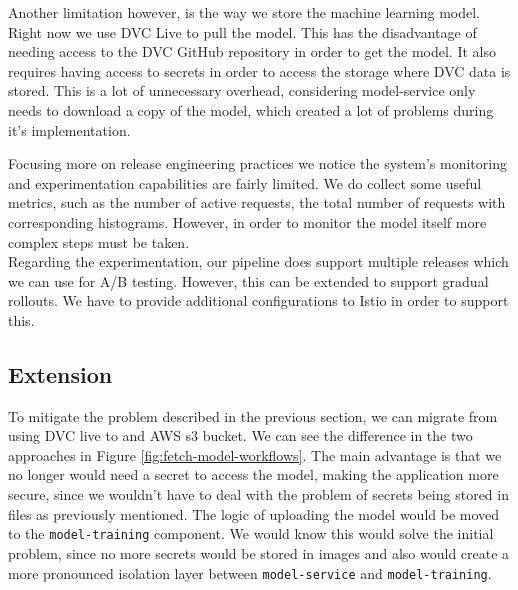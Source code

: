 Another limitation however, is the way we store the machine learning model. Right now we use DVC Live to pull the model. This has the disadvantage of needing access to the DVC GitHub repository in order to get the model. It also requires having access to secrets in order to access the storage where DVC data is stored. This is a lot of unnecessary overhead, considering model-service only needs to download a copy of the model, which created a lot of problems during it's implementation.   

Focusing more on release engineering practices we notice the system's monitoring and experimentation capabilities are fairly limited. We do collect some useful metrics, such as the number of active requests, the total number of requests with corresponding histograms. However, in order to monitor the model itself more complex steps must be taken. \\
Regarding the experimentation, our pipeline does support multiple releases which we can use for A/B testing. However, this can be extended to support gradual rollouts. We have to provide additional configurations to Istio in order to support this.   

\subsection{Extension} %
To mitigate the problem described in the previous section, we can migrate from using DVC live to and AWS s3 bucket. We can see the difference in the two approaches in Figure {\color{red}\ref{fig:fetch-model-workflows}}. The main advantage is that we no longer would need a secret to access the model, making the application more secure, since we wouldn't have to deal with the problem of secrets being stored in files as previously mentioned. The logic of uploading the model would be moved to the \texttt{model-training} component. We would know this would solve the initial problem, since no more secrets would be stored in images and also would create a more pronounced isolation layer between \texttt{model-service} and \texttt{model-training}. \\

